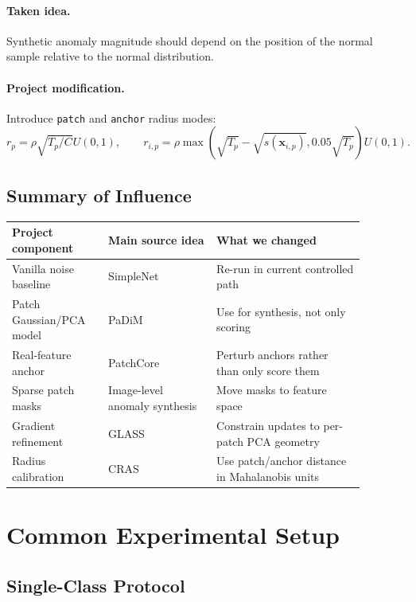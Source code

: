 \documentclass[11pt]{article}
\newcommand{\code}[1]{\texttt{#1}}
\begin{document}
\paragraph{Taken idea.}
Synthetic anomaly magnitude should depend on the position of the normal sample
relative to the normal distribution.

\paragraph{Project modification.}
Introduce \code{patch} and \code{anchor} radius modes:
\[
  r_p = \rho \sqrt{T_p/C}U(0,1),
  \qquad
  r_{i,p}
  =
  \rho
  \max\left(
    \sqrt{T_p} - \sqrt{s(\mathbf{x}_{i,p})},
    0.05\sqrt{T_p}
  \right)U(0,1).
\]

\subsection{Summary of Influence}

\begin{center}
\begin{tabular}{p{0.24\linewidth}p{0.27\linewidth}p{0.37\linewidth}}
\toprule
Project component & Main source idea & What we changed \\
\midrule
Vanilla noise baseline & SimpleNet & Re-run in current controlled path \\
Patch Gaussian/PCA model & PaDiM & Use for synthesis, not only scoring \\
Real-feature anchor & PatchCore & Perturb anchors rather than only score them \\
Sparse patch masks & Image-level anomaly synthesis & Move masks to feature space \\
Gradient refinement & GLASS & Constrain updates to per-patch PCA geometry \\
Radius calibration & CRAS & Use patch/anchor distance in Mahalanobis units \\
\bottomrule
\end{tabular}
\end{center}

\section{Common Experimental Setup}

\subsection{Single-Class Protocol}
\end{document}
